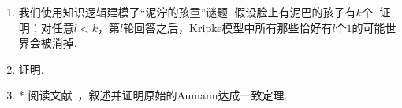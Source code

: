 \begin{enumerate}[wide, labelindent=0pt]
    \item  我们使用知识逻辑建模了“泥泞的孩童”谜题. 假设脸上有泥巴的孩子有$k$个. 证明：对任意$l<k$，第$l$轮回答之后，Kripke模型中所有那些恰好有$l$个$1$的可能世界会被消掉.

    \item \label{exercise:consistent-decision} 证明.
    
    \item *\label{exercise:Aumann-agreement} 阅读文献~\cite{aumannAgreeingDisagree1976}，叙述并证明原始的Aumann达成一致定理. 
\end{enumerate}
